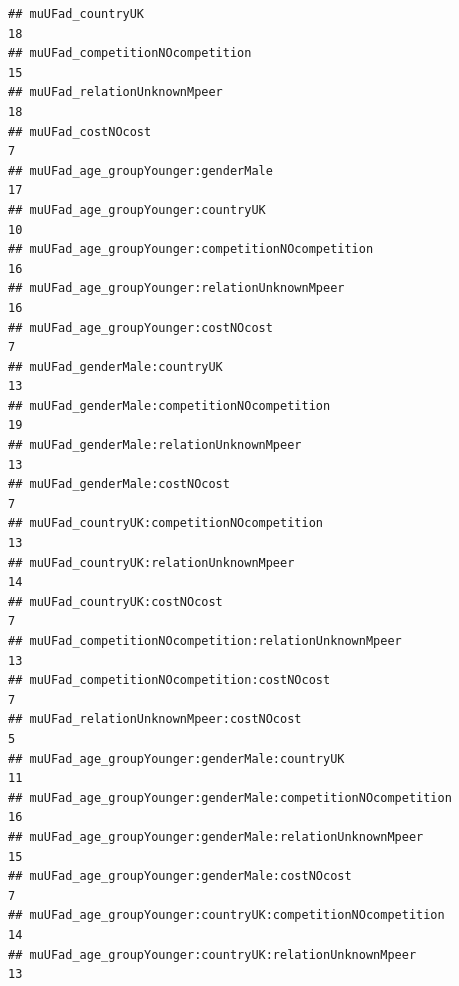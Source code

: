\documentclass[
]{article}
\begin{document}
\begin{verbatim}
## muUFad_countryUK                                                                                   18
## muUFad_competitionNOcompetition                                                                    15
## muUFad_relationUnknownMpeer                                                                        18
## muUFad_costNOcost                                                                                   7
## muUFad_age_groupYounger:genderMale                                                                 17
## muUFad_age_groupYounger:countryUK                                                                  10
## muUFad_age_groupYounger:competitionNOcompetition                                                   16
## muUFad_age_groupYounger:relationUnknownMpeer                                                       16
## muUFad_age_groupYounger:costNOcost                                                                  7
## muUFad_genderMale:countryUK                                                                        13
## muUFad_genderMale:competitionNOcompetition                                                         19
## muUFad_genderMale:relationUnknownMpeer                                                             13
## muUFad_genderMale:costNOcost                                                                        7
## muUFad_countryUK:competitionNOcompetition                                                          13
## muUFad_countryUK:relationUnknownMpeer                                                              14
## muUFad_countryUK:costNOcost                                                                         7
## muUFad_competitionNOcompetition:relationUnknownMpeer                                               13
## muUFad_competitionNOcompetition:costNOcost                                                          7
## muUFad_relationUnknownMpeer:costNOcost                                                              5
## muUFad_age_groupYounger:genderMale:countryUK                                                       11
## muUFad_age_groupYounger:genderMale:competitionNOcompetition                                        16
## muUFad_age_groupYounger:genderMale:relationUnknownMpeer                                            15
## muUFad_age_groupYounger:genderMale:costNOcost                                                       7
## muUFad_age_groupYounger:countryUK:competitionNOcompetition                                         14
## muUFad_age_groupYounger:countryUK:relationUnknownMpeer                                             13

\end{verbatim}
\end{document}
